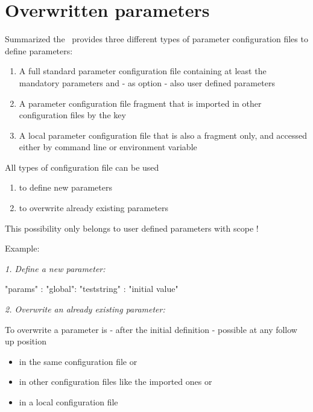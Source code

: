 \newpage

\section{Overwritten parameters}

Summarized the \pkg\ provides three different types of parameter configuration files to define parameters:

\begin{enumerate}
   \item A full standard parameter configuration file containing at least the mandatory parameters and - as option - also user defined parameters
   \item A parameter configuration file fragment that is imported in other configuration files by the \pcode{[import]} key
   \item A local parameter configuration file that is also a fragment only, and accessed either by command line or environment variable
\end{enumerate}

All types of configuration file can be used

\begin{enumerate}
   \item to define new parameters
   \item to overwrite already existing parameters
\end{enumerate}

This possibility only belongs to user defined parameters with scope !

\vspace{2ex}

Example:

\textit{1. Define a new parameter:}

\begin{pythoncode}
"params" : {
            "global": {
                       "teststring" : "initial value"
                      }
           }
\end{pythoncode}

\vspace{2ex}

\textit{2. Overwrite an already existing parameter:}

To overwrite a parameter is - after the initial definition - possible at any follow up position

\begin{itemize}
   \item in the same configuration file or
   \item in other configuration files like the imported ones or
   \item in a local configuration file
\end{itemize}

